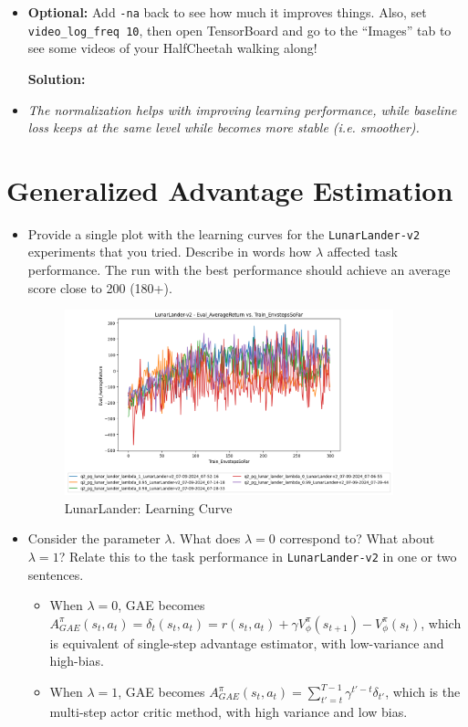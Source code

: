 \documentclass{article}
\begin{document}
\begin{itemize}
    \item \textbf{Optional:} Add \verb|-na| back to see how much it improves things. Also, set \verb|video_log_freq 10|, then open TensorBoard and go to the ``Images'' tab to see some videos of your HalfCheetah walking along!
    
    \textbf{Solution:} 
    \item \textit{The normalization helps with improving learning performance, while baseline loss keeps at the same level while becomes more stable (i.e. smoother).}
    
    
\end{itemize}

\newpage\section{Generalized Advantage Estimation}
\begin{itemize}
    \item Provide a single plot with the learning curves for the \verb|LunarLander-v2| experiments that you tried. Describe in words how $\lambda$ affected task performance. The run with the best performance should achieve an average score close to 200 (180+).
    \begin{figure}[ht]
    	\centering
    	\includegraphics[width=0.9\textwidth]{./images/6-LunarLander-LearningCurve.png}
    	\caption{LunarLander: Learning Curve}
    	\label{fig:6-LunarLander-LearningCurve}
    \end{figure}
    \item Consider the parameter $\lambda$. What does $\lambda = 0$ correspond to? What about $\lambda = 1$? Relate this to the task performance in \verb|LunarLander-v2| in one or two sentences.
    
    \begin{itemize}
	   \item When $\lambda=0$, GAE becomes $A_{GAE}^{\pi}(s_t, a_t)=\delta_t (s_t, a_t)=r(s_t, a_t) + \gamma V_{\phi}^{\pi}(s_{t+1}) - V_{\phi}^{\pi}(s_t)$, which is equivalent of single-step advantage estimator, with low-variance and high-bias.
    
	    \item When $\lambda=1$, GAE becomes  $A_{GAE}^{\pi}(s_t, a_t)=\sum_{t'=t}^{T-1}\gamma^{t'-t}\delta_{t'}$, which is the multi-step actor critic method, with high variance and low bias.
	\end{itemize}
\end{itemize}
\end{document}
